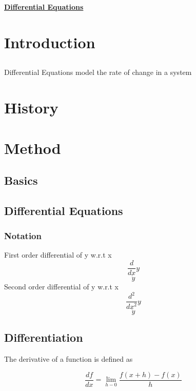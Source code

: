 \documentclass[10pt,a4paper]{report}
\begin{document}
	\begin{center}
		\underline{\textbf{Differential Equations}}
	\end{center}

\part{Introduction}
\chapter{}
Differential Equations model the rate of change in a system
\part{History}
\part{Method}
\chapter{Basics}
\chapter{Differential Equations}
\section{Notation}
First order differential of y w.r.t x
\begin{equation}
	\frac{d}{dx} y
\end{equation}
\begin{equation}
\dot y
\end{equation}
Second order differential of y w.r.t x
\begin{equation}
	\frac{d^2}{dx^2} y
\end{equation}
\begin{equation}
	\ddot y
\end{equation}


\chapter{Differentiation}

The derivative of a function is defined as

\begin{equation}
	\frac{df}{dx} = \lim\limits_{h - 0} \frac{f (x + h) - f (x)}{h}
\end{equation}
\end{document}
